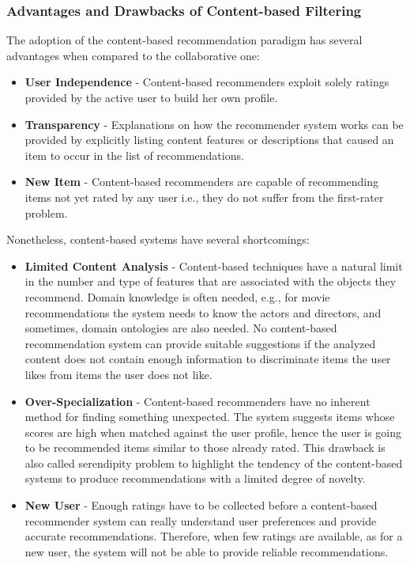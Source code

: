 \subsubsection{Advantages and Drawbacks of Content-based Filtering}

 The adoption of the content-based recommendation paradigm has several advantages when compared to the collaborative one:
\begin{itemize}
\item \textbf{User Independence} - Content-based recommenders exploit solely ratings provided by the active user to build her own profile.
\end{itemize}
\begin{itemize}
\item \textbf{Transparency} - Explanations on how the recommender system works can be provided by explicitly listing content features or descriptions that caused an item to occur in the list of recommendations. 
\end{itemize}
\begin{itemize}
\item \textbf{New Item} - Content-based recommenders are capable of recommending items not yet rated by any user i.e., they do not suffer from the first-rater problem.
\end{itemize}

 Nonetheless, content-based systems have several shortcomings:
\begin{itemize}
\item \textbf{Limited Content Analysis} - Content-based techniques have a natural limit in the number and type of features that are associated with the objects they recommend. Domain knowledge is often needed, e.g., for movie recommendations the system needs to know the actors and directors, and sometimes, domain ontologies are also needed. No content-based recommendation system can provide suitable suggestions if the analyzed content does not contain enough information to discriminate items the user likes from items the user does not like.
\end{itemize}
\begin{itemize}
\item \textbf{Over-Specialization} - Content-based recommenders have no inherent method for finding something unexpected. The system suggests items whose scores are high when matched against the user profile, hence the user is going to be recommended items similar to those already rated. This drawback is also called serendipity problem to highlight the tendency of the content-based systems to produce recommendations with a limited degree of novelty.
\end{itemize}
\begin{itemize}
\item \textbf{New User} - Enough ratings have to be collected before a content-based recommender system can really understand user preferences and provide accurate recommendations. Therefore, when few ratings are available, as for a new user, the system will not be able to provide reliable recommendations.
\end{itemize}

